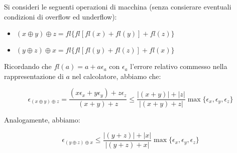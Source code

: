 
Si consideri le seguenti operazioni di macchina (senza consierare eventuali condizioni di overflow ed underflow):

\begin{itemize}

\item \((x \oplus y) \oplus z = fl\{ fl[ fl(x) + fl(y) ] + fl(z)\}\)
\item \((y \oplus z) \oplus x = fl\{ fl[ fl(y) + fl(z) ] + fl(x)\}\)

\end{itemize}

\noindent Ricordando che \(fl(a) = a + a\epsilon_a\) con \(\epsilon_a\) l'errore relativo commesso nella rappresentazione di \(a\) nel calcolatore, abbiamo che:

\[
\epsilon_{(x \oplus y) \oplus z } = \frac{(x \epsilon_x + y \epsilon_y) + z \epsilon_z}{(x+y)+z} \leq \frac{|(x+y)| + |z|}{|(x+y)+z|} \max\{\epsilon_x, \epsilon_y, \epsilon_z\}
\]

\noindent Analogamente, abbiamo:

\[
\epsilon_{(y \oplus z) \oplus x } \leq \frac{ |(y+z)| + |x| }{|(y+z) + x|}\max\{\epsilon_x, \epsilon_y, \epsilon_z\}
\]
